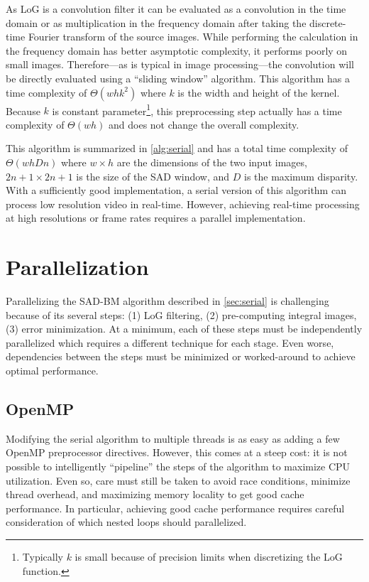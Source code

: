 \documentclass{article}
\let\orgautoref\autoref
\providecommand{\Cref}
        {\def\equationautorefname{Equation}%
         \def\figureautorefname{Figure}%
         \def\subfigureautorefname{Figure}%
         \def\Itemautorefname{Item}%
         \def\tableautorefname{Table}%
         \def\sectionautorefname{Section}%
         \def\subsectionautorefname{Section}%
         \def\subsubsectionautorefname{Section}%
         \def\chapterautorefname{Section}%
         \def\partautorefname{Part}%
         \orgautoref}
\begin{document}
As LoG is a convolution filter it can be evaluated as a convolution in the time
domain or as multiplication in the frequency domain after taking the
discrete-time Fourier transform of the source images. While performing the
calculation in the frequency domain has better asymptotic complexity, it
performs poorly on small images. Therefore---as is typical in image
processing---the convolution will be directly evaluated using a ``sliding
window'' algorithm. This algorithm has a time complexity of $\Theta(whk^2)$
where $k$ is the width and height of the kernel. Because $k$ is constant
parameter\footnote{Typically $k$ is small because of precision limits when
discretizing the LoG function.}, this preprocessing step actually has a time
complexity of $\Theta(wh)$ and does not change the overall complexity.

This algorithm is summarized in \Cref{alg:serial} and has a total time
complexity of $\Theta(whDn)$ where $w \times h$ are the dimensions of the two
input images, $2n + 1 \times 2n + 1$ is the size of the SAD window, and $D$ is
the maximum disparity. With a sufficiently good implementation, a serial
version of this algorithm can process low resolution video in real-time.
However, achieving real-time processing at high resolutions or frame rates
requires a parallel implementation.

\section{Parallelization}
\label{sec:parallel}
Parallelizing the SAD-BM algorithm described in \Cref{sec:serial} is
challenging because of its several steps: (1) LoG filtering, (2) pre-computing
integral images, (3) error minimization. At a minimum, each of these steps must
be independently parallelized which requires a different technique for each
stage. Even worse, dependencies between the steps must be minimized or
worked-around to achieve optimal performance.

\subsection{OpenMP}
\label{sec:parallel-omp}
Modifying the serial algorithm to multiple threads is as easy as adding a few
OpenMP preprocessor directives. However, this comes at a steep cost: it is not
possible to intelligently ``pipeline'' the steps of the algorithm to maximize
CPU utilization. Even so, care must still be taken to avoid race conditions,
minimize thread overhead, and maximizing memory locality to get good cache
performance. In particular, achieving good cache performance requires careful
consideration of which nested loops should parallelized. 
\end{document}
